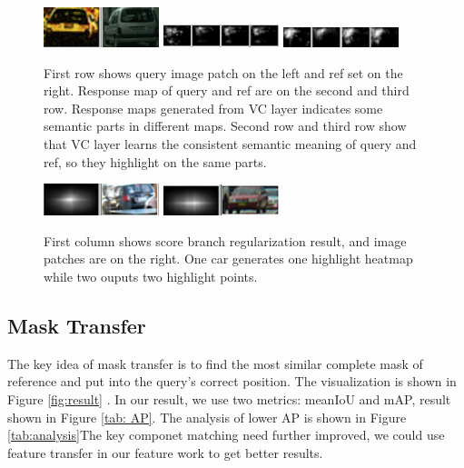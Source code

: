 \documentclass[10pt,twocolumn,letterpaper]{article}
\begin{document}
\begin{figure}
	\begin{center}
		\includegraphics[width=0.3\textwidth]{img_patch.png}
		\includegraphics[width=0.3\textwidth]{query_resp2.png}
		\includegraphics[width=0.3\textwidth]{ref_resp.png}
		\caption{First row shows query image patch on the left and ref set on the right. Response map of query and ref are on the second and 
			third row. Response maps generated from VC layer indicates some semantic parts in different maps. Second row and third row show that VC layer learns the consistent semantic meaning of query and ref, so they highlight on the same parts.}
			\label{fig:response_vis}
		\end{center}
		
	\end{figure}

\begin{figure}[h]
	\begin{center}
		\includegraphics[width=0.3\textwidth]{score_out.png}
		\includegraphics[width=0.3\textwidth]{score_out2.png}

		\caption{First column shows score branch regularization result, and image patches are on the right. One car generates one highlight heatmap while two ouputs two highlight points.}
		\label{fig:score_vis}
	\end{center}
	
\end{figure}
\subsection{Mask Transfer }
The key idea of mask transfer is to find the most similar complete mask of reference and put into the query's correct position. The visualization is shown in Figure \ref{fig:result} . In our result, we use two metrics: meanIoU and mAP, result shown in Figure \ref{tab: AP}. The analysis of lower AP is shown in Figure \ref{tab:analysis}The key componet matching need further improved, we could use feature transfer in our feature work to get better results.
\end{document}
